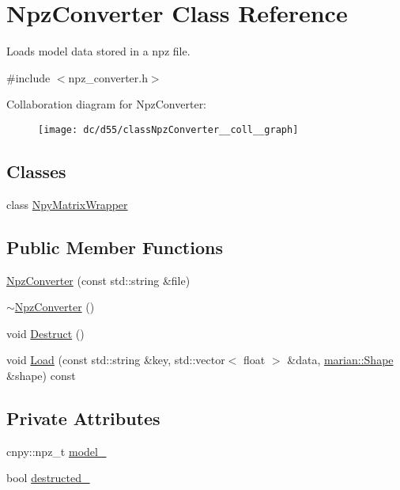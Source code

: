 \hypertarget{classNpzConverter}{}\section{Npz\+Converter Class Reference}
\label{classNpzConverter}


Loads model data stored in a npz file.  




{\ttfamily \#include $<$npz\+\_\+converter.\+h$>$}



Collaboration diagram for Npz\+Converter\+:
\nopagebreak
\begin{figure}[H]
\begin{center}
\leavevmode
\texttt{[image: dc/d55/classNpzConverter\_\_coll\_\_graph]}
\end{center}
\end{figure}
\subsection*{Classes}
\begin{DoxyCompactItemize}
\item 
class \hyperlink{classNpzConverter_1_1NpyMatrixWrapper}{Npy\+Matrix\+Wrapper}
\end{DoxyCompactItemize}
\subsection*{Public Member Functions}
\begin{DoxyCompactItemize}
\item 
\hyperlink{classNpzConverter_a8f9abbb8916c2e7853887ffa7b8f8b4f}{Npz\+Converter} (const std\+::string \&file)
\item 
\hyperlink{classNpzConverter_a73ef09375f8c238ae68b8c026e68128c}{$\sim$\+Npz\+Converter} ()
\item 
void \hyperlink{classNpzConverter_a5546c446fba3083e22e1741a1f08d80f}{Destruct} ()
\item 
void \hyperlink{classNpzConverter_aa996e7f76b03e6501f65a311a9dcd319}{Load} (const std\+::string \&key, std\+::vector$<$ float $>$ \&data, \hyperlink{structmarian_1_1Shape}{marian\+::\+Shape} \&shape) const 
\end{DoxyCompactItemize}
\subsection*{Private Attributes}
\begin{DoxyCompactItemize}
\item 
cnpy\+::npz\+\_\+t \hyperlink{classNpzConverter_a467a3df0a9b628e8eaec59bf455749b6}{model\+\_\+}
\item 
bool \hyperlink{classNpzConverter_a579f761f6926685004bd0a24f7d69ce8}{destructed\+\_\+}
\end{DoxyCompactItemize}


